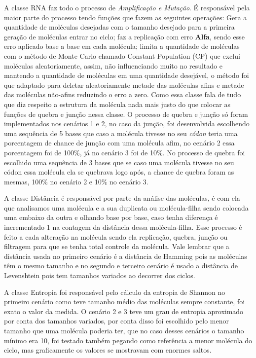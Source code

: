 A classe RNA faz todo o processo de \emph{Amplificação e Mutação}. É responsável pela
maior parte do processo tendo funções que fazem as seguintes operações: Gera a
quantidade de moléculas desejadas com o tamanho desejado para a primeira geração de
moléculas entrar no ciclo; faz a replicação com erro \textbf{Alfa}, sendo esse erro aplicado base
a base em cada molécula; limita a quantidade de moléculas com o método de Monte Carlo
chamado Constant Population (CP) que exclui moléculas aleatoriamente, assim, não
influenciando muito no resultado e mantendo a quantidade de moléculas em uma
quantidade desejável, o método foi que adaptado para deletar aleatoriamente metade das
moléculas afins e metade das moléculas não-afins reduzindo o erro a zero. Como essa
classe fala de tudo que diz respeito a estrutura da molécula nada mais justo do que colocar
as funções de quebra e junção nessa classe. O processo de quebra e junção só foram
implementados nos cenários 1 e 2, no caso da junção, foi desenvolvida escolhendo uma
sequência de 5 bases que caso a molécula tivesse no seu \emph{códon} teria uma porcentagem de
chance de junção com uma molécula afim, no cenário 2 essa porcentagem foi de 100\%,
já no cenário 3 foi de 10\%. No processo de quebra foi escolhido uma sequência de 3 bases
que se caso uma molécula tivesse no seu códon essa molécula ela se quebrava logo após,
a chance de quebra foram as mesmas, 100\% no cenário 2 e 10\% no cenário 3.

A classe Distância é responsável por parte da análise das moléculas, é com ela que
analisamos uma molécula e a sua duplicata ou molécula-filha sendo colocada uma
embaixo da outra e olhando base por base, caso tenha diferença é incrementado 1 na
contagem da distância dessa molécula-filha. Esse processo é feito a cada alteração na
molécula sendo ela replicação, quebra, junção ou filtragem para que se tenha total
controle da molécula. Vale lembrar que a distância usada no primeiro cenário é a distância
de Hamming pois as moléculas têm o mesmo tamanho e no segundo e terceiro cenário é
usado a distância de Levenshtein pois tem tamanhos variados ao decorrer dos ciclos.

A classe Entropia foi responsável pelo cálculo da entropia de Shannon no
primeiro cenário como teve tamanho médio das moléculas sempre constante, foi exato o
valor da medida. O cenário 2 e 3 teve um grau de entropia aproximado por conta dos
tamanhos variados, por conta disso foi escolhido pelo menor tamanho que uma molécula
poderia ter, que no caso desses cenários o tamanho mínimo era 10, foi testado também
pegando como referência a menor molécula do ciclo, mas graficamente os valores se
mostravam com enormes saltos.

